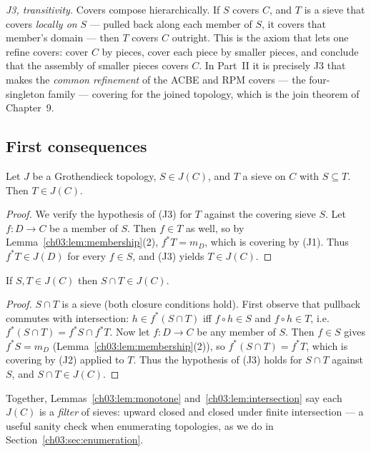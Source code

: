 \emph{J3, transitivity.} Covers compose hierarchically. If $S$
covers $C$, and $T$ is a sieve that covers \emph{locally on} $S$
--- pulled back along each member of $S$, it covers that member's
domain --- then $T$ covers $C$ outright. This is the axiom that
lets one refine covers: cover $C$ by pieces, cover each piece by
smaller pieces, and conclude that the assembly of smaller pieces
covers $C$. In Part~II it is precisely J3 that makes the
\emph{common refinement} of the ACBE and RPM covers --- the
four-singleton family --- covering for the joined topology, which
is the join theorem of Chapter~9.

\subsection{First consequences}\label{ch03:sec:consequences}

\begin{lemma}[Monotonicity]\label{ch03:lem:monotone}
Let $J$ be a Grothendieck topology, $S \in J(C)$, and $T$ a sieve on
$C$ with $S \subseteq T$. Then $T \in J(C)$.
\end{lemma}

\begin{proof}
We verify the hypothesis of (J3) for $T$ against the covering sieve
$S$. Let $f : D \to C$ be a member of $S$. Then $f \in T$ as well,
so by Lemma~\ref{ch03:lem:membership}(2), $f^* T = m_D$, which is
covering by (J1). Thus $f^* T \in J(D)$ for every $f \in S$, and
(J3) yields $T \in J(C)$.
\end{proof}

\begin{lemma}\label{ch03:lem:intersection}
If $S, T \in J(C)$ then $S \cap T \in J(C)$.
\end{lemma}

\begin{proof}
$S \cap T$ is a sieve (both closure conditions hold). First
observe that pullback commutes with intersection:
$h \in f^*(S \cap T)$ iff $f \circ h \in S$ and
$f \circ h \in T$, i.e.\ $f^*(S \cap T) = f^* S \cap f^* T$. Now
let $f : D \to C$ be any member of $S$. Then
$f \in S$ gives $f^* S = m_D$
(Lemma~\ref{ch03:lem:membership}(2)), so
$f^* (S \cap T) = f^* T$, which is covering by (J2) applied to
$T$. Thus the hypothesis of (J3) holds for $S \cap T$ against $S$,
and $S \cap T \in J(C)$.
\end{proof}

Together, Lemmas~\ref{ch03:lem:monotone}
and~\ref{ch03:lem:intersection} say each $J(C)$ is a \emph{filter}
of sieves: upward closed and closed under finite intersection ---
a useful sanity check when enumerating topologies, as we do in
Section~\ref{ch03:sec:enumeration}.

